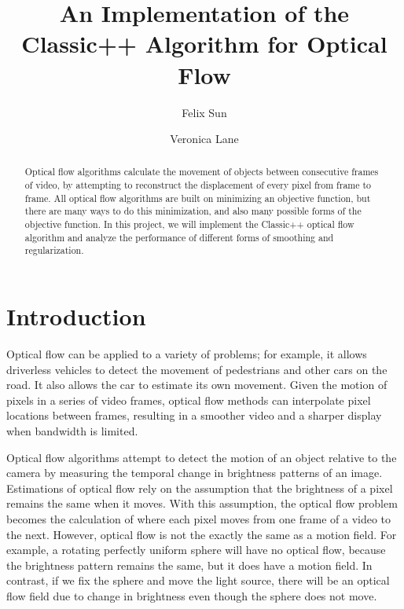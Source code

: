 \documentclass[10pt,twocolumn,letterpaper]{article}
\begin{document}
\title{An Implementation of the Classic++ Algorithm for Optical Flow}

\author{Felix Sun
\and
Veronica Lane
}

\maketitle
\begin{abstract}
Optical flow algorithms calculate the movement of objects between consecutive frames of video, by attempting to reconstruct the displacement of every pixel from frame to frame. All optical flow algorithms are built on minimizing an objective function, but there are many ways to do this minimization, and also many possible forms of the objective function. In this project, we will implement the Classic++ optical flow algorithm and analyze the performance of different forms of smoothing and regularization.
\end{abstract}


\section{Introduction}

Optical flow can be applied to a variety of problems; for example, it allows driverless vehicles to detect the movement of pedestrians and other cars on the road. It also allows the car to estimate its own movement. Given the motion of pixels in a series of video frames, optical flow methods can interpolate pixel locations between frames, resulting in a smoother video and a sharper display when bandwidth is limited.

Optical flow algorithms attempt to detect the motion of an object relative to the camera by measuring the temporal change in brightness patterns of an image. Estimations of optical flow rely on the assumption that the brightness of a pixel remains the same when it moves.  With this assumption, the optical flow problem becomes the calculation of where each pixel moves from one frame of a video to the next. \cite{fleet} However, optical flow is not the exactly the same as a motion field. For example, a rotating perfectly uniform sphere will have no optical flow, because the brightness pattern remains the same, but it does have a motion field. In contrast, if we fix the sphere and move the light source, there will be an optical flow field due to change in brightness even though the sphere does not move.
\end{document}
